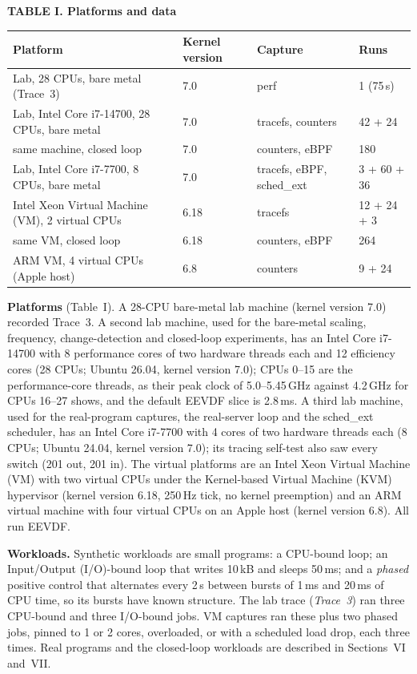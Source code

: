 \documentclass{article}
\begin{document}
\textbf{TABLE I. Platforms and data}




\begin{tabular}{llll}
\toprule
Platform & Kernel version & Capture & Runs \\
\midrule
Lab, 28 CPUs, bare metal (Trace~3) & 7.0 & perf & 1 (75\,s) \\
Lab, Intel Core i7-14700, 28 CPUs, bare metal & 7.0 & tracefs, counters & 42 + 24 \\
\quad same machine, closed loop & 7.0 & counters, eBPF & 180 \\
Lab, Intel Core i7-7700, 8 CPUs, bare metal & 7.0 & tracefs, eBPF, sched\_ext & 3 + 60 + 36 \\
Intel Xeon Virtual Machine (VM), 2 virtual CPUs & 6.18 & tracefs & 12 + 24 + 3 \\
\quad same VM, closed loop & 6.18 & counters, eBPF & 264 \\
ARM VM, 4 virtual CPUs (Apple host) & 6.8 & counters & 9 + 24 \\
\bottomrule
\end{tabular}




\textbf{Platforms} (Table~I). A 28-CPU bare-metal lab machine (kernel version 7.0) recorded Trace~3. A second lab machine, used for the bare-metal scaling, frequency, change-detection and closed-loop experiments, has an Intel Core i7-14700 with 8 performance cores of two hardware threads each and 12 efficiency cores (28 CPUs; Ubuntu 26.04, kernel version 7.0); CPUs 0--15 are the performance-core threads, as their peak clock of 5.0--5.45\,GHz against 4.2\,GHz for CPUs 16--27 shows, and the default EEVDF slice is 2.8\,ms. A third lab machine, used for the real-program captures, the real-server loop and the sched\_ext scheduler, has an Intel Core i7-7700 with 4 cores of two hardware threads each (8 CPUs; Ubuntu 24.04, kernel version 7.0); its tracing self-test also saw every switch (201 out, 201 in). The virtual platforms are an Intel Xeon Virtual Machine (VM) with two virtual CPUs under the Kernel-based Virtual Machine (KVM) hypervisor (kernel version 6.18, 250\,Hz tick, no kernel preemption) and an ARM virtual machine with four virtual CPUs on an Apple host (kernel version 6.8). All run EEVDF.

\textbf{Workloads.} Synthetic workloads are small programs: a CPU-bound loop; an Input/Output (I/O)-bound loop that writes 10\,kB and sleeps 50\,ms; and a \emph{phased} positive control that alternates every 2\,s between bursts of 1\,ms and 20\,ms of CPU time, so its bursts have known structure. The lab trace (\emph{Trace~3}) ran three CPU-bound and three I/O-bound jobs. VM captures ran these plus two phased jobs, pinned to 1 or 2 cores, overloaded, or with a scheduled load drop, each three times. Real programs and the closed-loop workloads are described in Sections~VI and~VII.
\end{document}
